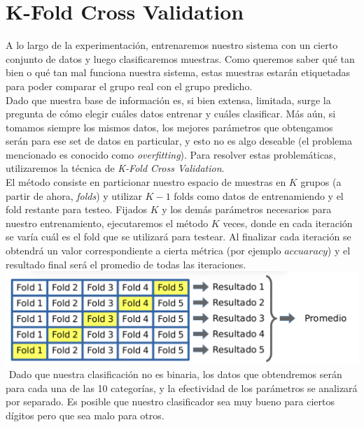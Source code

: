 \section{K-Fold Cross Validation}

A lo largo de la experimentación, entrenaremos nuestro sistema con un cierto conjunto de datos y luego clasificaremos muestras. Como queremos saber qué tan bien o qué tan mal funciona nuestra sistema, estas muestras estarán etiquetadas para poder comparar el grupo real con el grupo predicho. \\

Dado que nuestra base de información es, si bien extensa, limitada, surge la pregunta de cómo elegir cuáles datos entrenar y cuáles clasificar. Más aún, si tomamos siempre los mismos datos, los mejores parámetros que obtengamos serán para ese set de datos en particular, y esto no es algo deseable (el problema mencionado es conocido como \textit{overfitting}). Para resolver estas problemáticas, utilizaremos la técnica de \textit{K-Fold Cross Validation}. \\

El método consiste en particionar nuestro espacio de muestras en $K$ grupos (a partir de ahora, \textit{folds}) y utilizar $K - 1$ folds como datos de entrenamiendo y el fold restante para testeo. Fijados $K$ y los demás parámetros necesarios para nuestro entrenamiento, ejecutaremos el método $K$ veces, donde en cada iteración se varía cuál es el fold que se utilizará para testear. Al finalizar cada iteración se obtendrá un valor correspondiente a cierta métrica (por ejemplo $accuaracy$) y el resultado final será el promedio de todas las iteraciones. \\

{\centering
    \includegraphics[scale=0.30]{informe/imagenes/kfold/kfoldEjemplo2.png} \\
}
$ $\newline
Dado que nuestra clasificación no es binaria, los datos que obtendremos serán para cada una de las 10 categorías, y la efectividad de los parámetros se analizará por separado. Es posible que nuestro clasificador sea muy bueno para ciertos dígitos pero que sea malo para otros. \\



